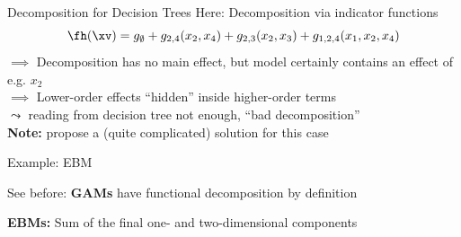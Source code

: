 \documentclass[10pt,compress,t,notes=noshow, xcolor=table]{beamer}
\begin{document}
\begin{framev}[align=top]{Decomposition for Decision Trees}
Here: Decomposition via indicator functions
$$
\fh(\xv) = g_\emptyset + g_{2,4}(x_2, x_4) + g_{2,3}(x_2, x_3) + g_{1, 2, 4}(x_1, x_2, x_4)
$$
$\implies$ Decomposition has no main effect, but model certainly contains an effect of e.g. $x_2$\\
\spacer[0.25]
$\implies$ Lower-order effects ``hidden'' inside higher-order terms\\
\spacer[0.25]
$\leadsto$ reading from decision tree not enough, ``bad decomposition''\\



\pause
\spacer[0.25]
\textbf{Note:}  propose a (quite complicated) solution for this case
\end{framev}


\begin{framev}[align=top]{Example: EBM}
\begin{itemizeM}
\item See before: \textbf{GAMs} have functional decomposition by definition
\item \textbf{EBMs:} Sum of the final one- and two-dimensional components
\end{itemizeM}
\end{framev}



\endlecture
\end{document}
